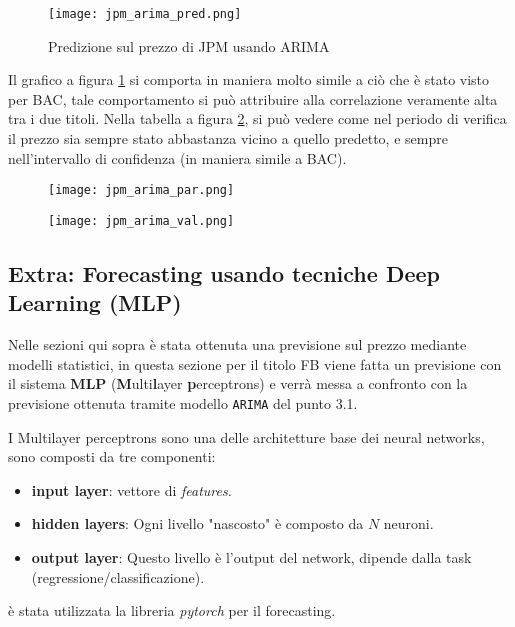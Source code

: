 \begin{figure}[ht]
    \centering
    \texttt{[image: jpm\_arima\_pred.png]}
    \caption{Predizione sul prezzo di JPM usando ARIMA}
    \label{fig:jpm_arima_pred}
\end{figure}

Il grafico a figura \ref{fig:jpm_arima_pred} si comporta in maniera molto simile a ciò che è stato visto per BAC, tale comportamento si può attribuire alla correlazione
veramente alta tra i due titoli. Nella tabella a figura \ref{fig:jpm_arima_val}, si può vedere come nel periodo di verifica il prezzo sia sempre stato abbastanza vicino a quello predetto, e sempre 
nell'intervallo di confidenza (in maniera simile a BAC).

\begin{figure}[ht]
    \centering
    \begin{minipage}{.5\textwidth}
        \centering
        \vspace{2.53cm}
        \texttt{[image: jpm\_arima\_par.png]}
        \label{fig:jpm_arima_param}
    \end{minipage}%
    \begin{minipage}{.5\textwidth}
        \centering
        \texttt{[image: jpm\_arima\_val.png]}
        \label{fig:jpm_arima_val}
    \end{minipage}
\end{figure}

\pagebreak

\subsection{Extra: Forecasting usando tecniche Deep Learning (MLP)}

Nelle sezioni qui sopra è stata ottenuta una previsione sul prezzo mediante modelli statistici, in questa sezione
per il titolo FB viene fatta un previsione con il sistema \textbf{MLP} (\textbf{M}ulti\textbf{l}ayer \textbf{p}erceptrons)
e verrà messa a confronto con la previsione ottenuta tramite modello \verb|ARIMA| del punto 3.1.

I Multilayer perceptrons sono una delle architetture base dei neural networks, sono composti da tre componenti:
\begin{itemize}
    \item \textbf{input layer}: vettore di \emph{features}.
    \item \textbf{hidden layers}: Ogni livello "nascosto" è composto da $N$ neuroni.
    \item \textbf{output layer}: Questo livello è l'output del network, dipende dalla task (regressione/classificazione).
\end{itemize}
è stata utilizzata la libreria \emph{pytorch} per il forecasting.


